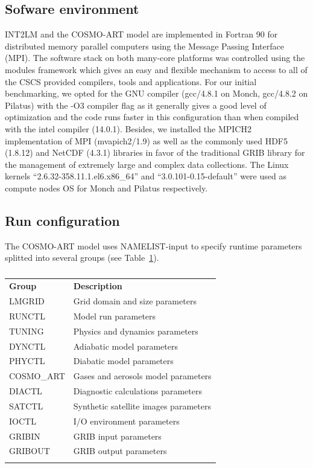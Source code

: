 \subsection{Sofware environment}
\label{subsec:3.1}
INT2LM  and the  COSMO-ART model  are  implemented in  Fortran 90  for
distributed  memory  parallel  computers  using  the  Message  Passing
Interface (MPI).   The software stack on both  many-core platforms was
controlled  using  the  modules  framework  which gives  an  easy  and
flexible mechanism  to access to  all of the CSCS  provided compilers,
tools and  applications.  For our  initial benchmarking, we  opted for
the GNU compiler  (gcc/4.8.1 on Monch, gcc/4.8.2 on  Pilatus) with the
-O3 compiler flag  as it generally gives a  good level of optimization
and the code runs faster in this configuration than when compiled with
the  intel  compiler  (14.0.1).   Besides,  we  installed  the  MPICH2
implementation of MPI (mvapich2/1.9) as well as the commonly used HDF5
(1.8.12) and NetCDF (4.3.1) libraries in favor of the traditional GRIB
library  for  the  management  of  extremely large  and  complex  data
collections.   The Linux  kernels  ``2.6.32-358.11.1.el6.x86\_64'' and
``3.0.101-0.15-default'' were  used as compute nodes OS  for Monch and
Pilatus respectively.

\subsection{Run configuration}
\label{subsec:3.2}
The COSMO-ART model uses NAMELIST-input to specify runtime parameters
splitted into several groups (see Table~\ref{tab:1}). 

\begin{table}[htbf]
  \begin{center}
    \caption{}
    \label{tab:1}
    \begin{tabular}{ll}
      \hline\noalign{\smallskip} 
      \textbf{Group} & \textbf{Description} \\
      \noalign{\smallskip}\hline\noalign{\smallskip}
      LMGRID & Grid domain and size parameters \\
      RUNCTL & Model run parameters \\
      TUNING & Physics and dynamics parameters \\
      DYNCTL & Adiabatic model parameters \\
      PHYCTL & Diabatic model parameters \\
      COSMO\_ART & Gases and aerosols model parameters \\
      DIACTL & Diagnostic calculations parameters \\
      SATCTL & Synthetic satellite images parameters \\
      IOCTL & I/O environment parameters \\
      GRIBIN & GRIB input parameters \\
      GRIBOUT & GRIB output parameters \\
     \noalign{\smallskip}\hline
    \end{tabular}
  \end{center}
\end{table}

